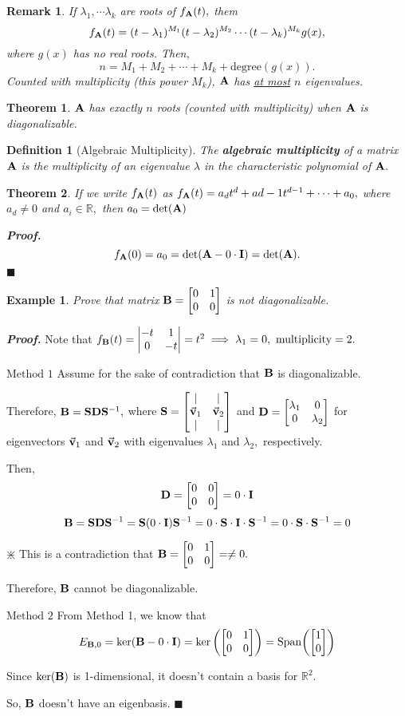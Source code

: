 \documentclass[12pt, a4paper]{article}
\newtheorem{thm}{Theorem}[subsection]
\newtheorem{df}{Definition}[subsection]
\newtheorem{eg}{Example}[subsection]
\newtheorem*{rmk}{\indent Remark}
\newenvironment*{prf}{\par\indent\textbf{\textit{Proof. }}}{\hfill $\blacksquare$\par}
\def\R{{\mathbb{R}}}
\def\Span{\mathrm{Span}}
\def\vecv{\va{v}}
\def\matrixA{\vb{A}}
\def\matrixB{\vb{B}}
\def\matrixD{\vb{D}}
\def\matrixI{\vb{I}}
\def\matrixS{\vb{S}}
\begin{document}
\begin{rmk}
	If $\lambda_1,\cdots\lambda_k$ are roots of $f_{\matrixA}(t),$ them \[f_{\matrixA}(t)=(t-\lambda_1)^{M_1}(t-\lambda_2)^{M_2}\cdots(t-\lambda_k)^{M_k}g(x),\] where $g(x)$ has no real roots. Then, \[n=M_1+M_2+\cdots+M_k+\text{degree}(g(x)).\] Counted with multiplicity (this power $M_k$), $\matrixA$ has \underline{at most} $n$ eigenvalues.
\end{rmk}
\begin{thm}
	$\matrixA$ has exactly $n$ roots (counted with multiplicity) when $\matrixA$ is diagonalizable.	
\end{thm}
\begin{df}[Algebraic Multiplicity]
	The \textbf{algebraic multiplicity} of a matrix $\matrixA$ is the multiplicity of an eigenvalue $\lambda$ in the characteristic polynomial of $\matrixA.$
\end{df}
\begin{thm}
	If we write $f_{\matrixA}(t)$ as $f_{\matrixA}(t)=a_dt^d+a{d-1}t^{d-1}+\cdots+a_0,$ where $a_d\neq0$ and $a_i\in\R,$  then $a_0=\det(\matrixA)$
\end{thm}
\begin{prf}
	\[f_{\matrixA}(0)=a_0=\det(\matrixA-0\cdot\matrixI)=\det(\matrixA).\]	
\end{prf}
\begin{eg}
	Prove that matrix $\matrixB=\mqty[0&1\\0&0]$ is not diagonalizable. 	
\end{eg}
\begin{prf}
	Note that $f_{\matrixB}(t)=\mqty|{-t&1\\0&-t}|=t^2\implies\lambda_1=0,\ \text{multiplicity}=2.$	\par $\boxed{\text{Method }1}$ Assume for the sake of contradiction that $\matrixB$ is diagonalizable.\par Therefore, $\matrixB=\matrixS\matrixD\matrixS^{-1},$ where $\matrixS=\mqty[|&|\\\vecv_1&\vecv_2\\|&|]$ and $\matrixD=\mqty[\lambda_1&0\\0&\lambda_2]$ for eigenvectors $\vecv_1$ and $\vecv_2$ with eigenvalues $\lambda_1$ and $\lambda_2,$ respectively. \par Then, \[\matrixD=\mqty[0&0\\0&0]=0\cdot\matrixI\]\[\matrixB=\matrixS\matrixD\matrixS^{-1}=\matrixS(0\cdot\matrixI)\matrixS^{-1}=0\cdot\matrixS\cdot\matrixI\cdot\matrixS^{-1}=0\cdot\matrixS\cdot\matrixS^{-1}=0\]\par$\divideontimes$ This is a contradiction that $\matrixB=\mqty[0&1\\0&0]=\neq0.$\par Therefore, $\matrixB$ cannot be diagonalizable.\par $\boxed{\text{Method }2}$ From Method 1, we know that \[E_{\matrixB,0}=\ker(\matrixB-0\cdot\matrixI)=\ker\qty(\mqty[0&1\\0&0])=\Span\qty(\mqty[1\\0])\]\par Since $\ker(\matrixB)$ is 1-dimensional, it doesn't contain a basis for $\R^2.$\par So, $\matrixB$ doesn't have an eigenbasis.
\end{prf}
\end{document}
